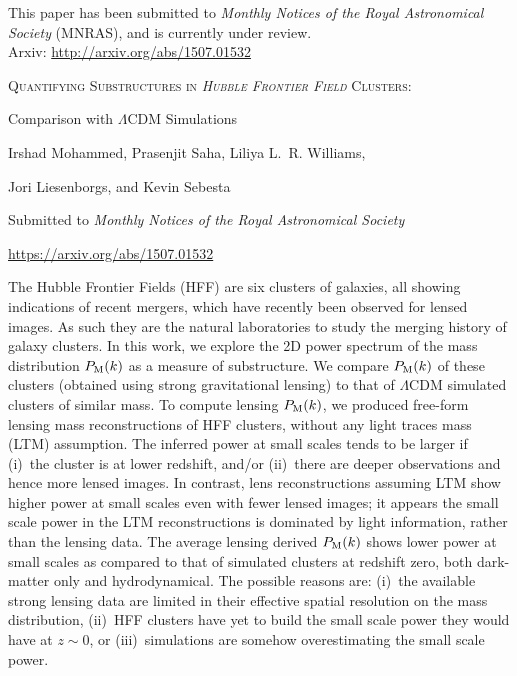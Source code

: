 \documentclass[
  11pt,
  twoside,
  openright,
  titlepage,
  headings=optiontoheadandtoc
]{scrbook}
\begin{document}
This paper has been submitted to {\it Monthly Notices of the Royal Astronomical
Society} (MNRAS), and is currently under review.
\\
Arxiv: \url{http://arxiv.org/abs/1507.01532}

\begin{publishedpaper}
  {\fontsize{18}{22}\selectfont\scshape
   Quantifying Substructures in \textit{Hubble Frontier Field} Clusters:\par
   Comparison with $\Lambda$CDM Simulations\par}

  \vspace{1.25em}

  {\large
   Irshad Mohammed, Prasenjit Saha, Liliya L.~R. Williams,\par
   Jori Liesenborgs, and Kevin Sebesta\par}

  \vspace{1.25em}
  {\small
   Submitted to \textit{Monthly Notices of the Royal Astronomical Society}\par
   \url{https://arxiv.org/abs/1507.01532}\par}
\end{publishedpaper}

\begin{paperabstract}
The Hubble Frontier Fields (HFF) are six clusters of galaxies, all showing indications of
recent mergers, which have recently been observed for lensed images.
As such they are the natural laboratories to study the merging history of galaxy clusters.
In this work, we explore the 2D power spectrum of the mass distribution $P_{\rm M}(k)$
as a measure of substructure.
We compare $P_{\rm M}(k)$  of these clusters (obtained using
strong gravitational lensing) to that of $\Lambda$CDM simulated clusters of similar mass.
To compute lensing $P_{\rm M}(k)$,  we produced
free-form lensing mass reconstructions of HFF clusters, without any light traces mass (LTM)
assumption. The inferred power at small scales tends to be larger if (i)~the cluster is
at lower redshift, and/or (ii)~there are deeper observations and hence more lensed images.
In contrast, lens reconstructions assuming LTM show higher power at small
scales even with fewer lensed images; it appears the small scale power in the LTM reconstructions
is dominated by light information, rather than the lensing data.
The average lensing derived $P_{\rm M}(k)$ shows lower power at small scales as compared
to that of simulated clusters at redshift zero, both dark-matter only and hydrodynamical.
The possible reasons are: (i)~the available strong lensing data are limited in their
effective spatial resolution on the mass distribution, (ii)~HFF clusters have yet to build
the small scale power they would have at $z\sim 0$, or (iii)~simulations are
somehow overestimating the small scale power.
\end{paperabstract}
\end{document}
